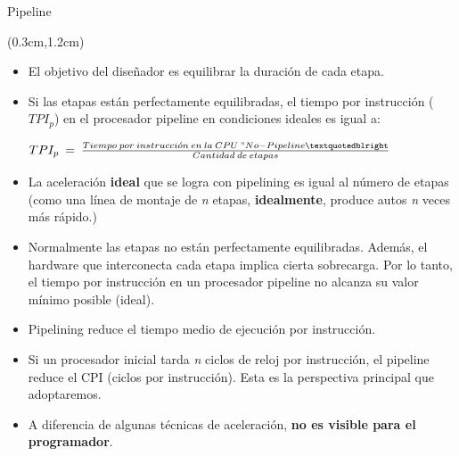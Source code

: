 \documentclass[table,dvipsnames,aspectratio=169]{beamer}
\begin{document}
\begin{frame}{Pipeline}
 \begin{textblock*}{\textwidth}(0.3cm,1.2cm)
  \begin{itemize}[<+->] \justifying
   \item El objetivo del diseñador es equilibrar la duración de cada etapa.
   \item Si las etapas están perfectamente equilibradas, el tiempo por instrucción ($TPI_{p}$) en el procesador pipeline en condiciones ideales es igual a:
   \begin{center}
    $ TPI_{p}\: =\: \frac{Tiempo\: por\: instrucci\acute{o}n\: en\: la\: CPU\: " No-Pipeline\textquotedblright}{Cantidad\: de\: etapas} $
   \end{center}
   \item La aceleración \textbf{\color{Blue}ideal} que se logra con pipelining es igual al número de etapas (como una línea de montaje de \textit{n} etapas, \textbf{\color{Blue}idealmente}, produce autos \textit{n} veces más rápido.)
   \item Normalmente las etapas no están perfectamente equilibradas. Además, el hardware que interconecta cada etapa implica cierta sobrecarga. Por lo tanto, el tiempo por instrucción en un procesador pipeline no alcanza su valor mínimo posible (ideal).
   \item Pipelining reduce el tiempo medio de ejecución por instrucción.
   \item Si un procesador inicial tarda \textit{n} ciclos de reloj por instrucción, el pipeline reduce el CPI (ciclos por instrucción). Esta es la perspectiva principal que adoptaremos.
   \item A diferencia de algunas técnicas de aceleración, \textbf{\color{Blue}no es visible para el programador}.
  \end{itemize}
 \end{textblock*}
\end{frame}
\end{document}

